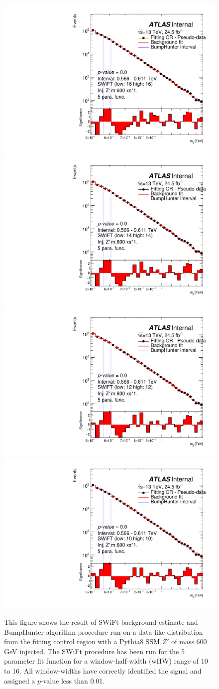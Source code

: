 \begin{figure}[!htb]
\captionsetup[subfigure]{aboveskip=0pt,justification=centering}
\centering
{} {
  \includegraphics[width=0.3\linewidth, angle=0]{figs/Dibjet/LowMass/FitStudy/bhFit_corrFitCR_dataLike_v13_5para_low16_high16_inj_Zprimebb600_xsFactor1.pdf}
}
 {
  \includegraphics[width=0.3\linewidth, angle=0]{figs/Dibjet/LowMass/FitStudy/bhFit_corrFitCR_dataLike_v13_5para_low14_high14_inj_Zprimebb600_xsFactor1.pdf}
}\\
 {
  \includegraphics[width=0.3\linewidth, angle=0]{figs/Dibjet/LowMass/FitStudy/bhFit_corrFitCR_dataLike_v13_5para_low12_high12_inj_Zprimebb600_xsFactor1.pdf}
}
 {
  \includegraphics[width=0.3\linewidth, angle=0]{figs/Dibjet/LowMass/FitStudy/bhFit_corrFitCR_dataLike_v13_5para_low10_high10_inj_Zprimebb600_xsFactor1.pdf}
}
\vspace{10pt}
\caption{\label{fig:bhFit_lm_corrFitCR_dataLike_inj_Zprimebb600_xsFactor1}
  This figure shows the result of SWiFt background estimate and {\sc BumpHunter} algorithm procedure run on a data-like distribution
  from the fitting control region with a Pythia8 SSM $Z'$ of mass 600 GeV injected.
  The SWiFt procedure has been run for the 5 parameter fit function for a window-half-width (wHW) range of 10 to 16.
  All window-widths have correctly identified the signal and assigned a $p$-value less than 0.01.
}
\end{figure}

